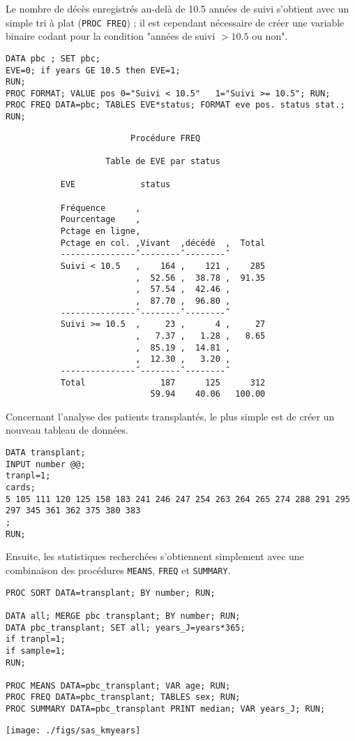 Le nombre de décès enregistrés au-delà de 10.5 années de suivi s'obtient
avec un simple tri à plat (\texttt{PROC FREQ}) ; il est cependant nécessaire
de créer une variable binaire codant pour la condition "années de suivi
$>10.5$ ou non".
\begin{verbatim}
DATA pbc ; SET pbc;
EVE=0; if years GE 10.5 then EVE=1;
RUN;
PROC FORMAT; VALUE pos 0="Suivi < 10.5"   1="Suivi >= 10.5"; RUN;
PROC FREQ DATA=pbc; TABLES EVE*status; FORMAT eve pos. status stat.; RUN;
\end{verbatim}

\begin{verbatim}
                         Procédure FREQ

                    Table de EVE par status

           EVE             status

           Fréquence      ‚
           Pourcentage    ‚
           Pctage en ligne‚
           Pctage en col. ‚Vivant  ‚décédé  ‚  Total
           ---------------ˆ--------ˆ--------ˆ
           Suivi < 10.5   ‚    164 ‚    121 ‚    285
                          ‚  52.56 ‚  38.78 ‚  91.35
                          ‚  57.54 ‚  42.46 ‚
                          ‚  87.70 ‚  96.80 ‚
           ---------------ˆ--------ˆ--------ˆ
           Suivi >= 10.5  ‚     23 ‚      4 ‚     27
                          ‚   7.37 ‚   1.28 ‚   8.65
                          ‚  85.19 ‚  14.81 ‚
                          ‚  12.30 ‚   3.20 ‚
           ---------------ˆ--------ˆ--------ˆ
           Total               187      125      312
                             59.94    40.06   100.00
\end{verbatim}

Concernant l'analyse des patients transplantés, le plus simple est de créer
un nouveau tableau de données.
\begin{verbatim}
DATA transplant;
INPUT number @@;
tranpl=1;
cards;
5 105 111 120 125 158 183 241 246 247 254 263 264 265 274 288 291 295 297 345 361 362 375 380 383
;
RUN;
\end{verbatim}
Ensuite, les statistiques recherchées s'obtiennent simplement avec une
combinaison des procédures \texttt{MEANS}, \texttt{FREQ} et
\texttt{SUMMARY}.
\begin{verbatim}
PROC SORT DATA=transplant; BY number; RUN;

DATA all; MERGE pbc transplant; BY number; RUN;
DATA pbc_transplant; SET all; years_J=years*365;
if tranpl=1;
if sample=1;
RUN;

PROC MEANS DATA=pbc_transplant; VAR age; RUN;
PROC FREQ DATA=pbc_transplant; TABLES sex; RUN;
PROC SUMMARY DATA=pbc_transplant PRINT median; VAR years_J; RUN;
\end{verbatim}


\texttt{[image: ./figs/sas\_kmyears]}

\label{stop:sol11b}
